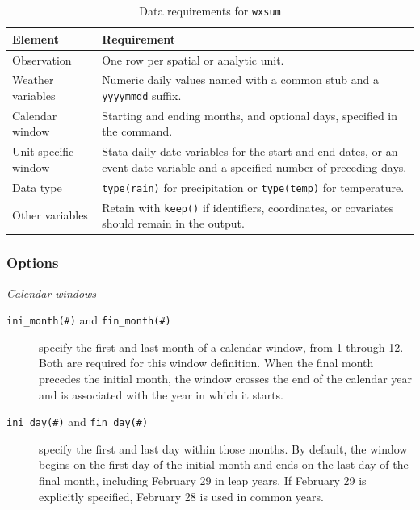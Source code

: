 \begin{table}[htbp]
	\caption{Data requirements for \texttt{wxsum}}
	\label{tab:datareq}
	\begin{center}
		\begin{tabularx}{\textwidth}{>{\raggedright\arraybackslash}p{}>{\raggedright\arraybackslash}X}
			\hline
			Element & Requirement \\
			\hline
			Observation & One row per spatial or analytic unit. \\
			Weather variables & Numeric daily values named with a common stub and a \texttt{yyyymmdd} suffix. \\
			Calendar window & Starting and ending months, and optional days, specified in the command. \\
			Unit-specific window & Stata daily-date variables for the start and end dates, or an event-date variable and a specified number of preceding days. \\
			Data type & \texttt{type(rain)} for precipitation or \texttt{type(temp)} for temperature. \\
			Other variables & Retain with \texttt{keep()} if identifiers, coordinates, or covariates should remain in the output. \\
			\hline
		\end{tabularx}
	\end{center}
\end{table}

\subsubsection{Options}

\noindent\textit{Calendar windows}

\begin{description}
	\item[\texttt{ini\_month(\#)} and \texttt{fin\_month(\#)}] specify the first and last month of a calendar window, from 1 through 12. Both are required for this window definition. When the final month precedes the initial month, the window crosses the end of the calendar year and is associated with the year in which it starts.
	\item[\texttt{ini\_day(\#)} and \texttt{fin\_day(\#)}] specify the first and last day within those months. By default, the window begins on the first day of the initial month and ends on the last day of the final month, including February 29 in leap years. If February 29 is explicitly specified, February 28 is used in common years.
\end{description}

